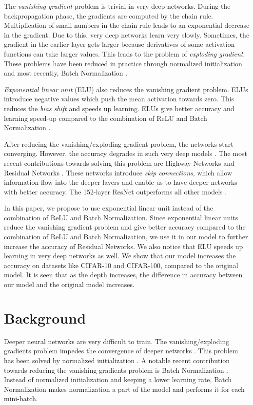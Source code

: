 \documentclass[10pt,twocolumn,letterpaper]{article}
\begin{document}
The \emph{vanishing gradient} problem is trivial in very deep networks. During the backpropagation phase, the gradients are computed by the chain rule. Multiplication of small numbers in the chain rule leads to an exponential decrease in the gradient. Due to this, very deep networks learn very slowly. Sometimes, the gradient in the earlier layer gets larger because derivatives of some activation functions can take larger values. This leads to the problem of \emph{exploding gradient}. These problems have been reduced in practice through normalized initialization \cite{[3]} and most recently, Batch Normalization \cite{[4]}.

\emph{Exponential linear unit} (ELU) \cite{[9]} also reduces the vanishing gradient problem. ELUs introduce negative values which push the mean activation towards zero. This reduces the \emph{bias shift} and speeds up learning. ELUs give better accuracy and learning speed-up compared to the combination of ReLU \cite{[8]} and Batch Normalization \cite{[4]}.

After reducing the vanishing/exploding gradient problem, the networks start converging. However, the accuracy degrades in such very deep models \cite{[1]}. The most recent contributions towards solving this problem are Highway Networks \cite{[7]} and Residual Networks \cite{[1]}. These networks introduce \emph{skip connections}, which allow information flow into the deeper layers and enable us to have deeper networks with better accuracy. The 152-layer ResNet outperforms all other models \cite{[1]}.

In this paper, we propose to use exponential linear unit instead of the combination of ReLU and Batch Normalization. Since exponential linear units reduce the vanishing gradient problem and give better accuracy compared to the combination of ReLU and Batch Normalization, we use it in our model to further increase the accuracy of Residual Networks. We also notice that ELU speeds up learning in very deep networks as well. We show that our model increases the accuracy on datasets like CIFAR-10 and CIFAR-100, compared to the original model. It is seen that as the depth increases, the difference in accuracy between our model and the original model increases.


\section{Background}

Deeper neural networks are very difficult to train. The vanishing/exploding gradients problem impedes the convergence of deeper networks \cite{[3]}. This problem has been solved by normalized initialization \cite{[3], [5], [6]}. A notable recent contribution towards reducing the vanishing gradients problem is Batch Normalization \cite{[4]}. Instead of normalized initialization and keeping a lower learning rate, Batch Normalization makes normalization a part of the model and performs it for each mini-batch.
\end{document}
